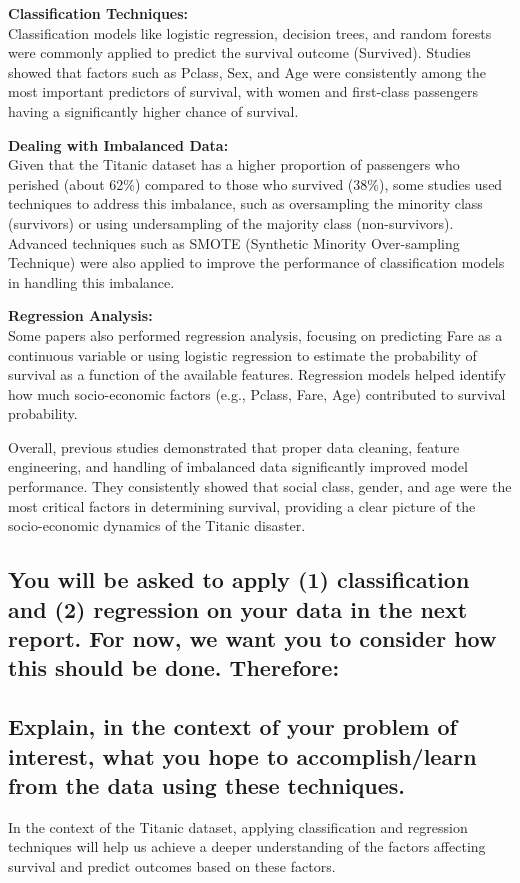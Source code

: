 \documentclass[twoside,11pt]{article}
\begin{document}
\textbf{Classification Techniques:} \\
Classification models like logistic regression, decision trees, and random forests were commonly applied to predict the survival outcome (Survived). Studies showed that factors such as Pclass, Sex, and Age were consistently among the most important predictors of survival, with women and first-class passengers having a significantly higher chance of survival.

\textbf{Dealing with Imbalanced Data:} \\
Given that the Titanic dataset has a higher proportion of passengers who perished (about 62\%) compared to those who survived (38\%), some studies used techniques to address this imbalance, such as oversampling the minority class (survivors) or using undersampling of the majority class (non-survivors). Advanced techniques such as SMOTE (Synthetic Minority Over-sampling Technique) were also applied to improve the performance of classification models in handling this imbalance.

\textbf{Regression Analysis:} \\
Some papers also performed regression analysis, focusing on predicting Fare as a continuous variable or using logistic regression to estimate the probability of survival as a function of the available features. Regression models helped identify how much socio-economic factors (e.g., Pclass, Fare, Age) contributed to survival probability.

Overall, previous studies demonstrated that proper data cleaning, feature engineering, and handling of imbalanced data significantly improved model performance. They consistently showed that social class, gender, and age were the most critical factors in determining survival, providing a clear picture of the socio-economic dynamics of the Titanic disaster.

\subsection{You will be asked to apply (1) classification and (2) regression on your data in the next report. For now, we want you to consider how this should be done. Therefore:}

\subsection*{Explain, in the context of your problem of interest, what you hope to accomplish/learn from the data using these techniques.}
In the context of the Titanic dataset, applying classification and regression techniques will help us achieve a deeper understanding of the factors affecting survival and predict outcomes based on these factors.
\end{document}
